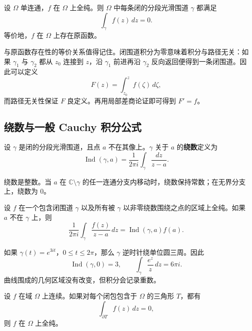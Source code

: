 \begin{theorem}
设 $\Omega$ 单连通，$f$ 在 $\Omega$ 上全纯。则 $\Omega$ 中每条闭的分段光滑围道 $\gamma$ 都满足
\[
    \int_\gamma f(z)\,dz=0.
\]
等价地，$f$ 在 $\Omega$ 上存在原函数。
\end{theorem}

\begin{remark}
与原函数存在性的等价关系值得记住。闭围道积分为零意味着积分与路径无关：如果 $\gamma_1$ 与 $\gamma_2$ 都从 $z_0$ 连接到 $z$，沿 $\gamma_1$ 前进再沿 $\gamma_2$ 反向返回便得到一条闭围道。因此可以定义
\[
    F(z)=\int_{z_0}^{z}f(\zeta)\,d\zeta,
\]
而路径无关性保证 $F$ 良定义。再用局部差商论证即可得到 $F'=f$。
\end{remark}

\subsection{绕数与一般 Cauchy 积分公式}

\begin{definition}[绕数]
设 $\gamma$ 是闭的分段光滑围道，且点 $a$ 不在其像上。$\gamma$ 关于 $a$ 的\textbf{绕数}定义为
\[
    \operatorname{Ind}(\gamma,a)
    =\frac{1}{2\pi i}\int_\gamma\frac{dz}{z-a}.
\]
\end{definition}

\begin{proposition}
绕数是整数。当 $a$ 在 $\mathbb{C}\setminus\gamma$ 的任一连通分支内移动时，绕数保持常数；在无界分支上，绕数为 $0$。
\end{proposition}

\begin{theorem}
设 $f$ 在一个包含闭围道 $\gamma$ 以及所有被 $\gamma$ 以非零绕数围绕之点的区域上全纯。如果 $a$ 不在 $\gamma$ 上，则
\[
    \frac{1}{2\pi i}\int_\gamma\frac{f(z)}{z-a}\,dz
    =\operatorname{Ind}(\gamma,a)f(a).
\]
\end{theorem}

\begin{example}
如果 $\gamma(t)=e^{3it}$，$0\leq t\leq2\pi$，那么 $\gamma$ 逆时针绕单位圆三周。因此
\[
    \operatorname{Ind}(\gamma,0)=3,
    \qquad
    \int_\gamma\frac{e^z}{z}\,dz=6\pi i.
\]
曲线围成的几何区域没有改变，但积分会记录重数。
\end{example}

\begin{theorem}[Morera 定理]
设 $f$ 在域 $\Omega$ 上连续。如果对每个闭包包含于 $\Omega$ 的三角形 $T$，都有
\[
    \int_{\partial T}f(z)\,dz=0,
\]
则 $f$ 在 $\Omega$ 上全纯。
\end{theorem}

